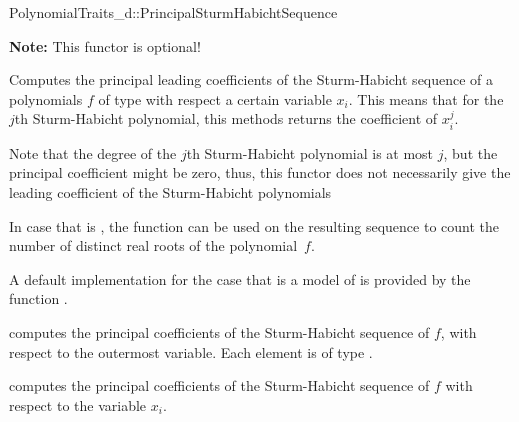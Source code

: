 \begin{ccRefConcept}{PolynomialTraits_d::PrincipalSturmHabichtSequence}

\textbf{Note:} This functor is optional!

\ccDefinition

Computes the principal leading coefficients of the Sturm-Habicht sequence 
of a polynomials $f$ of type  
with respect a certain variable $x_i$.
This means that for the $j$th Sturm-Habicht polynomial, this methods returns
the coefficient of $x_i^j$. 

Note that the degree of the $j$th Sturm-Habicht polynomial is at most $j$,
but the principal coefficient might be zero, thus, this functor does not
necessarily give the leading coefficient of the Sturm-Habicht polynomials

In case that  is , the function  can be used
on the resulting sequence to count the number of distinct real roots of
the polynomial~$f$.

A default implementation for the case that 
is a model of 
is provided by the function .

\ccOperations
{}
         { computes the principal coefficients of the 
           Sturm-Habicht sequence of $f$, 
           with respect to the outermost variable. Each element is of type
           .}

         { computes the principal coefficients 
           of the Sturm-Habicht sequence of $f$ 
           with respect to the variable $x_i$.}


\ccSeeAlso

\\
\\
\\
\\

\end{ccRefConcept}
